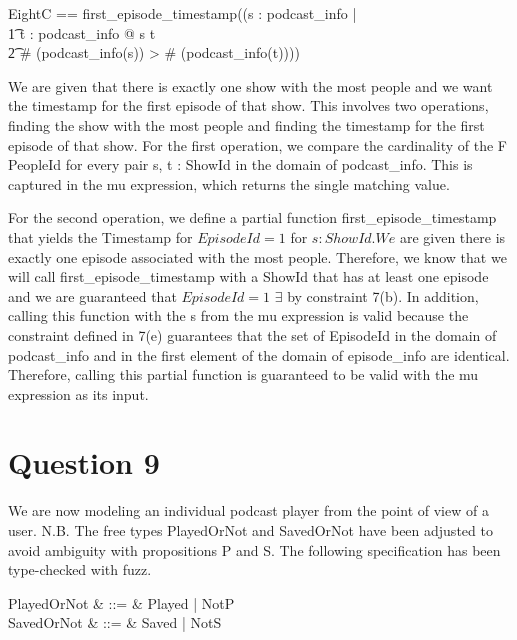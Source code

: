 \documentclass[a4paper,10pt,fleqn]{article}
\begin{document}
\bigskip

\setlength{\leftskip}{\dimexpr\parindent+2em\relax}
\begin{zed}
EightC == first\_episode\_timestamp((\mu s : \dom podcast\_info | \\
\t1 \forall t : \dom podcast\_info @ s \neq t \land \\
\t2 \# (podcast\_info(s)) > \# (podcast\_info(t))))
\end{zed}

\noindent We are given that there is exactly one show with the most people and we want the timestamp for the first episode of that show. This involves two operations, finding the show with the most people and finding the timestamp for the first episode of that show.  For the first operation, we compare the cardinality of the F PeopleId for every pair s, t : ShowId in the domain of podcast\_info. This is captured in the mu expression, which returns the single matching value.

\bigskip

\noindent For the second operation, we define a partial function first\_episode\_timestamp that yields the Timestamp for $EpisodeId = 1$ for $s : ShowId.  We$ are given there is exactly one episode associated with the most people. Therefore, we know that we will call first\_episode\_timestamp with a ShowId that has at least one episode and we are guaranteed that $EpisodeId = 1$ $\exists$ by constraint 7(b). In addition, calling this function with the s from the mu expression is valid because the constraint defined in 7(e) guarantees that the set of EpisodeId in the domain of podcast\_info and in the first element of the domain of episode\_info are identical. Therefore, calling this partial function is guaranteed to be valid with the mu expression as its input.

\bigskip

\setlength{\leftskip}{0pt}
\section*{Question 9}

\noindent We are now modeling an individual podcast player from the point of view of a user.  N.B. The free types PlayedOrNot and SavedOrNot have been adjusted to avoid ambiguity with propositions P and S. The following specification has been type-checked with fuzz. 

\bigskip

\begin{syntax}
PlayedOrNot & ::= & Played | NotP \\
SavedOrNot & ::= & Saved | NotS
\end{syntax}
\end{document}
